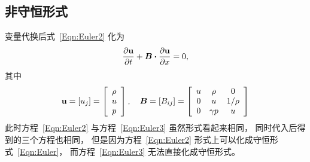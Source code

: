 \documentclass[10.5pt
]{article}
\begin{document}
\subsection{非守恒形式}
变量代换后式~\eqref{Eqn:Euler2} 化为
\begin{align}
\pdv{\vb u}{t} + \vb*B \vdot \pdv{\vb u}{x} = 0,
\label{Eqn:Euler3}
\end{align}
其中
\begin{align}
\vb u = [u_j] = \left[\begin{array}{c}\rho\\ u\\ p\end{array}\right], \quad \vb*B = [B_{ij}] = \left[\begin{array}{ccc}u & \rho & 0\\
0 & u & 1/\rho\\ 0 & \gamma p & u\end{array}\right]
\end{align}
此时方程~\eqref{Eqn:Euler2} 与方程~\eqref{Eqn:Euler3} 虽然形式看起来相同，
同时代入后得到的三个方程也相同，
但是因为方程~\eqref{Eqn:Euler2} 形式上可以化成守恒形式~\eqref{Eqn:Euler}，
而方程~\eqref{Eqn:Euler3} 无法直接化成守恒形式。
\end{document}
